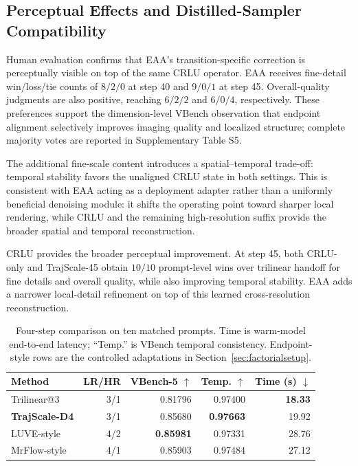 \subsection{Perceptual Effects and Distilled-Sampler Compatibility}

Human evaluation confirms that EAA's transition-specific correction is
perceptually visible on top of the same CRLU operator. EAA receives fine-detail
win/loss/tie counts of \(8/2/0\) at step 40 and \(9/0/1\) at step 45.
Overall-quality judgments are also positive, reaching \(6/2/2\) and
\(6/0/4\), respectively. These preferences support the dimension-level VBench
observation that endpoint alignment selectively improves imaging quality and
localized structure; complete majority votes are reported in Supplementary
Table S5.

The additional fine-scale content introduces a spatial--temporal trade-off:
temporal stability favors the unaligned CRLU state in both settings. This is
consistent with EAA acting as a deployment adapter rather than a uniformly
beneficial denoising module: it shifts the operating point toward sharper local
rendering, while CRLU and the remaining high-resolution suffix provide the
broader spatial and temporal reconstruction.

CRLU provides the broader perceptual improvement. At step 45, both CRLU-only
and TrajScale-45 obtain \(10/10\) prompt-level wins over trilinear handoff for
fine details and overall quality, while also improving temporal stability. EAA
adds a narrower local-detail refinement on top of this learned
cross-resolution reconstruction.

\begin{table}[!t]
\centering
\footnotesize
\setlength{\tabcolsep}{2.4pt}
\begin{tabular}{lrrrr}
\toprule
Method & LR/HR & VBench-5 \(\uparrow\) & Temp. \(\uparrow\) &
Time (s) \(\downarrow\) \\
\midrule
Trilinear@3 & 3/1 & 0.81796 & 0.97400 & \textbf{18.33} \\
\textbf{TrajScale-D4} & 3/1 & 0.85680 & \textbf{0.97663} & 19.92 \\
LUVE-style & 4/2 & \textbf{0.85981} & 0.97331 & 28.76 \\
MrFlow-style & 4/1 & 0.85903 & 0.97484 & 27.12 \\
\bottomrule
\end{tabular}
\caption{Four-step comparison on ten matched prompts. Time is warm-model
end-to-end latency; ``Temp.'' is VBench temporal consistency. Endpoint-style
rows are the controlled adaptations in Section~\ref{sec:factorialsetup}.}
\label{tab:distill4}
\end{table}

